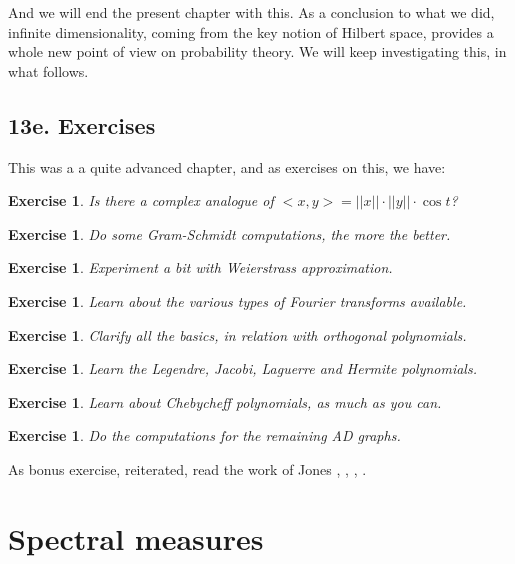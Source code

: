 \documentclass[12pt]{amsbook}
\newtheorem{exercise}[theorem]{Exercise}
\begin{document}
And we will end the present chapter with this. As a conclusion to what we did, infinite dimensionality, coming from the key notion of Hilbert space, provides a whole new point of view on probability theory. We will keep investigating this, in what follows.

\section*{13e. Exercises}

This was a a quite advanced chapter, and as exercises on this, we have:

\begin{exercise}
Is there a complex analogue of $<x,y>=||x||\cdot||y||\cdot\cos t$?
\end{exercise}

\begin{exercise}
Do some Gram-Schmidt computations, the more the better.
\end{exercise}

\begin{exercise}
Experiment a bit with Weierstrass approximation.
\end{exercise}

\begin{exercise}
Learn about the various types of Fourier transforms available.
\end{exercise}

\begin{exercise}
Clarify all the basics, in relation with orthogonal polynomials.
\end{exercise}

\begin{exercise}
Learn the Legendre, Jacobi, Laguerre and Hermite polynomials.
\end{exercise}

\begin{exercise}
Learn about Chebycheff polynomials, as much as you can.
\end{exercise}

\begin{exercise}
Do the computations for the remaining AD graphs.
\end{exercise}

As bonus exercise, reiterated, read the work of Jones \cite{jo1}, \cite{jo2}, \cite{jo3}, \cite{jo4}.

\chapter{Spectral measures}
\end{document}
